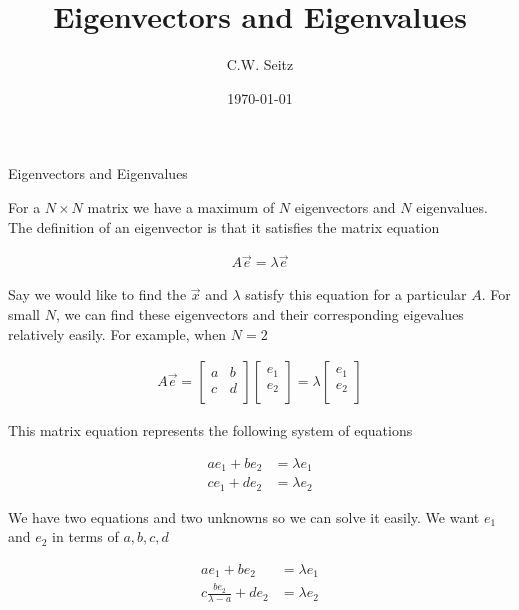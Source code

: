 \documentclass{article}
\title{Eigenvectors and Eigenvalues}
\author{C.W. Seitz}
\date{\today}
\begin{document}
\maketitle

\begin{section}{Eigenvectors and Eigenvalues}

For a $N\times N$ matrix we have a maximum of $N$ eigenvectors and $N$ eigenvalues. The definition of an eigenvector is that it satisfies the matrix equation

\begin{align*}
A\vec{e} = \lambda \vec{e}
\end{align*}

Say we would like to find the $\vec{x}$ and $\lambda$ satisfy this equation for a particular $A$. For small $N$, we can find these eigenvectors and their corresponding eigevalues relatively easily. For example, when $N=2$ 

\begin{align*}
A\vec{e} = \begin{bmatrix}
    a & b\\
    c & d\\
\end{bmatrix}
\begin{bmatrix}
    e_{1}\\
    e_{2}\\
\end{bmatrix}
= \lambda  \begin{bmatrix}
    e_{1}\\
    e_{2}\\
\end{bmatrix}
\end{align*}

This matrix equation represents the following system of equations

\begin{align*}
ae_{1}+be_{2} &= \lambda e_{1}\\
ce_{1}+de_{2} &= \lambda e_{2}
\end{align*}

We have two equations and two unknowns so we can solve it easily. We want $e_{1}$ and $e_{2}$ in terms of $a,b,c,d$

\begin{align*}
ae_{1}+be_{2} &= \lambda e_{1}\\
c\frac{be_{2}}{\lambda - a} + de_{2} &= \lambda e_{2}
\end{align*}


\end{section}
\end{document}
